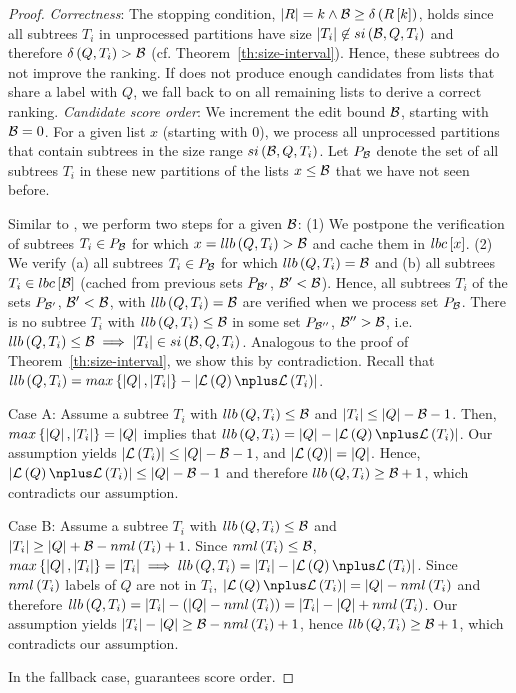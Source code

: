 \begin{proof}
\emph{Correctness}: The stopping condition, $\left| R \right| = k \land \mathcal{B} \geq \delta \left( R\left[ k \right] \right)$, holds since all subtrees $T_i$ in unprocessed partitions have size $\left| T_i \right| \not\in si \left( \mathcal{B}, Q, T_i \right)$ and therefore $\delta \left( Q, T_i \right) > \mathcal{B}$ (cf. Theorem~\ref{th:size-interval}). Hence, these subtrees do not improve the ranking.
%
If \cone{} does not produce enough candidates from lists that share a label with $Q$, we fall back to \lowerboundmerge{} on all remaining lists to derive a correct ranking.
%
\emph{Candidate score order}: We increment the edit bound $\mathcal{B}$, starting with $\mathcal{B} = 0$. For a given list $x$ (starting with $0$), we process all unprocessed partitions that contain subtrees in the size range $si \left( \mathcal{B}, Q, T_i \right)$. Let $P_{\mathcal{B}}$ denote the set of all subtrees $T_i$ in these new partitions of the lists $x \leq \mathcal{B}$ that we have not seen before.

Similar to \lowerboundmerge{}, we perform two steps for a given $\mathcal{B}$: (1) We postpone the verification of subtrees $T_i \in P_{\mathcal{B}}$ for which $x = llb \left( Q, T_i \right) > \mathcal{B}$ and cache them in $lbc\left[ x \right]$. (2) We verify (a) all subtrees $T_i \in P_{\mathcal{B}}$ for which $llb \left( Q, T_i \right) = \mathcal{B}$ and (b) all subtrees $T_i \in lbc\left[ \mathcal{B} \right]$ (cached from previous sets $P_{\mathcal{B}'}$, $\mathcal{B}' < \mathcal{B}$).
%
Hence, all subtrees $T_i$ of the sets $P_{\mathcal{B}'}$, $\mathcal{B}' < \mathcal{B}$, with $llb \left( Q, T_i \right) = \mathcal{B}$ are verified when we process set $P_{\mathcal{B}}$.
%
There is no subtree $T_i$ with $llb \left( Q, T_i \right) \leq \mathcal{B}$ in some set $P_{\mathcal{B}''}$, $\mathcal{B}'' > \mathcal{B}$, i.e. $llb \left( Q, T_i \right) \leq \mathcal{B} \implies \left| T_i \right| \in si \left( \mathcal{B}, Q, T_i \right)$.
%
Analogous to the proof of Theorem~\ref{th:size-interval}, we show this by contradiction. Recall that $\LLBshort{Q}{T_i} = \LLB{Q}{T_i}$.

Case A: Assume a subtree $T_i$ with $llb \left( Q, T_i \right) \leq \mathcal{B}$ and $\left| T_i \right| \leq \left| Q \right| - \mathcal{B} - 1$.
%
Then, $max \left\{ \left| Q \right|, \left| T_i \right| \right\} = \left| Q \right|$ implies that $\LLBshort{Q}{T_i} = \sizeOf{Q} - \MultisetOverlapSize{Q}{T_i}$.
%
Our assumption yields $\left| \mathcal{L} \left( T_i \right) \right| \leq \left| Q \right| - \mathcal{B} - 1$, and $\left| \mathcal{L} \left( Q \right) \right| = \left| Q \right|$.
%
Hence, $\MultisetOverlapSize{Q}{T_i} \leq \sizeOf{Q} - \BigB - 1$ and therefore $llb \left( Q, T_i \right) \geq \mathcal{B} + 1$, which contradicts our assumption.

Case B: Assume a subtree $T_i$ with $llb \left( Q, T_i \right) \leq \mathcal{B}$ and $\left| T_i \right| \geq \left| Q \right| + \mathcal{B} - nml \left( T_i \right) + 1$.
%
Since $nml \left( T_i \right) \leq \mathcal{B}$, $\Max{\sizeOf{Q}, \sizeOf{T_i}} = \sizeOf{T_i} \implies \LLBshort{Q}{T_i} = \sizeOf{T_i} - \MultisetOverlapSize{Q}{T_i}$.
%
Since $nml \left( T_i \right)$ labels of $Q$ are not in $T_i$, $\MultisetOverlapSize{Q}{T_i} = \sizeOf{Q} - \lOf{T_i}$ and therefore $llb \left( Q, T_i \right) = \left| T_i \right| - \left( \left| Q \right| - nml \left( T_i \right) \right) = \left| T_i \right| - \left| Q \right| + nml \left( T_i \right)$.
%
Our assumption yields $\left| T_i \right| - \left| Q \right| \geq \mathcal{B} - nml \left( T_i \right) + 1$, hence $llb \left( Q, T_i \right) \geq \mathcal{B} + 1$, which contradicts our assumption.

In the fallback case, \lowerboundmerge{} guarantees score order.
\end{proof}

